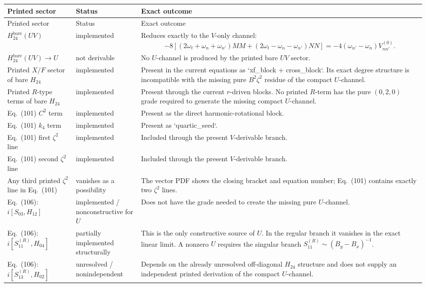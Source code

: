 \documentclass[11pt]{article}
\begin{document}
\begin{longtable}{>{\raggedright\arraybackslash}p{4.4cm} >{\raggedright\arraybackslash}p{3.2cm} >{\raggedright\arraybackslash}p{6.6cm}}
\toprule
Printed sector & Status & Exact outcome \\
\midrule
\endfirsthead
\toprule
Printed sector & Status & Exact outcome \\
\midrule
\endhead
\(H_{24}^{\mathrm{bare}}(UV)\) & implemented & Reduces exactly to the \(V\)-only channel:
\[
-8[(2\omega_t+\omega_n+\omega_{n'})MM+(2\omega_t-\omega_n-\omega_{n'})NN]
=-4(\omega_{n'}-\omega_n)V_{nn'}^{(0)}.
\]
\\
\(H_{24}^{\mathrm{bare}}(UV)\to U\) & not derivable & No \(U\)-channel is produced by the printed bare \(UV\) sector. \\
Printed \(X/F\) sector of bare \(H_{24}\) & implemented & Present in the current equations as `xf_block + cross_block`. Its exact degree structure is incompatible with the missing pure \(B^2\zeta^2\) residue of the compact \(U\)-channel. \\
Printed \(R\)-type terms of bare \(H_{24}\) & implemented & Present through the current \(r\)-driven blocks. No printed \(R\)-term has the pure \((0,2,0)\) grade required to generate the missing compact \(U\)-channel. \\
Eq.~(101) \(C^2\) term & implemented & Present as the direct harmonic-rotational block. \\
Eq.~(101) \(k_4\) term & implemented & Present as `quartic_seed`. \\
Eq.~(101) first \(\zeta^2\) line & implemented & Included through the present \(V\)-derivable branch. \\
Eq.~(101) second \(\zeta^2\) line & implemented & Included through the present \(V\)-derivable branch. \\
Any third printed \(\zeta^2\) line in Eq.~(101) & vanishes as a possibility & The vector PDF shows the closing bracket and equation number; Eq.~(101) contains exactly two \(\zeta^2\) lines. \\
Eq.~(106): \(i[S_{03},H_{12}]\) & implemented / nonconstructive for \(U\) & Does not have the grade needed to create the missing pure \(U\)-channel. \\
Eq.~(106): \(i[S_{11}^{(R)},H_{04}]\) & partially implemented structurally & This is the only constructive source of \(U\). In the regular branch it vanishes in the exact linear limit. A nonzero \(U\) requires the singular branch \(S_{11}^{(R)}\sim(B_y-B_x)^{-1}\). \\
Eq.~(106): \(i[S_{13}^{(R)},H_{02}]\) & unresolved / nonindependent & Depends on the already unresolved off-diagonal \(H_{24}\) structure and does not supply an independent printed derivation of the compact \(U\)-channel. \\
\bottomrule
\end{longtable}
\end{document}
